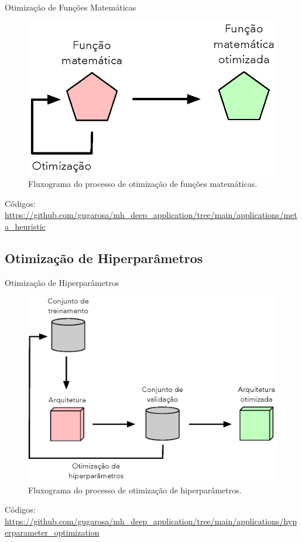 \begin{frame}{Otimização de Funções Matemáticas}
	\begin{figure}
		\centering
		\includegraphics[scale=0.6]{figs/benchmark_opt.eps}	
		\caption{Fluxograma do processo de otimização de funções matemáticas.}
		\label{f.benchmark_opt}
	\end{figure}
	Códigos: \url{https://github.com/gugarosa/mh_deep_application/tree/main/applications/meta_heuristic}
\end{frame}

\subsection{Otimização de Hiperparâmetros}
\label{ss.applications_hyperparameter}

\begin{frame}{Otimização de Hiperparâmetros}
	\begin{figure}
		\centering
		\includegraphics[scale=0.45]{figs/hyperparameter_opt.eps}	
		\caption{Fluxograma do processo de otimização de hiperparâmetros.}
		\label{f.hyperparameter_opt}
	\end{figure}
	Códigos: \url{https://github.com/gugarosa/mh_deep_application/tree/main/applications/hyperparameter_optimization}
\end{frame}

